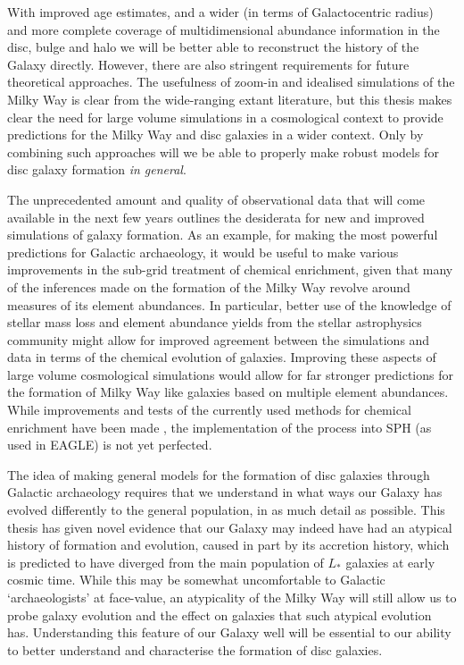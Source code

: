 With improved age estimates, and a wider (in terms of Galactocentric radius) and more complete coverage of multidimensional abundance information in the disc, bulge and halo we will be better able to reconstruct the history of the Galaxy directly. However, there are also stringent requirements for future theoretical approaches. The usefulness of zoom-in and idealised simulations of the Milky Way is clear from the wide-ranging extant literature, but this thesis makes clear the need for large volume simulations in a cosmological context to provide predictions for the Milky Way and disc galaxies in a wider context. Only by combining such approaches will we be able to properly make robust models for disc galaxy formation \emph{in general}. 

The unprecedented amount and quality of observational data that will come available in the next few years outlines the desiderata for new and improved simulations of galaxy formation. As an example, for making the most powerful predictions for Galactic archaeology, it would be useful to make various improvements in the sub-grid treatment of chemical enrichment, given that many of the inferences made on the formation of the Milky Way revolve around measures of its element abundances. In particular, better use of the knowledge of stellar mass loss and element abundance yields from the stellar astrophysics community might allow for improved agreement between the simulations and data in terms of the chemical evolution of galaxies. Improving these aspects of large volume cosmological simulations would allow for far stronger predictions for the formation of Milky Way like galaxies based on multiple element abundances. While improvements and tests of the currently used methods for chemical enrichment have been made \citep[e.g.][]{2009MNRAS.399..574W}, the implementation of the process into SPH (as used in EAGLE) is not yet perfected.

The idea of making general models for the formation of disc galaxies through Galactic archaeology requires that we understand in what ways our Galaxy has evolved differently to the general population, in as much detail as possible. This thesis has given novel evidence that our Galaxy may indeed have had an atypical history of formation and evolution, caused in part by its accretion history, which is predicted to have diverged from the main population of $L_*$ galaxies at early cosmic time. While this may be somewhat uncomfortable to Galactic `archaeologists' at face-value, an atypicality of the Milky Way will still allow us to probe galaxy evolution and the effect on galaxies that such atypical evolution has. Understanding this feature of our Galaxy well will be essential to our ability to better understand and characterise the formation of disc galaxies.